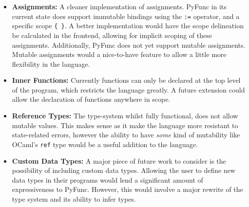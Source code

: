 \documentclass{l4proj}
\begin{document}
\begin{itemize}
    \item \textbf{Assignments:} A cleaner implementation of assignments.
    PyFunc in its current state does support immutable bindings using the \texttt{:=} operator, and a specific scope \texttt{\{ \}}.
    A better implementation would have the scope delineation be calculated in the frontend, allowing for implicit scoping of these assignments.
    Additionally, PyFunc does not yet support mutable assignments.
    Mutable assignments would a nice-to-have feature to allow a little more flexibility in the language.
    \item \textbf{Inner Functions:} Currently functions can only be declared at the top level of the program, which restricts the language greatly.
    A future extension could allow the declaration of functions anywhere in scope.

    \item \textbf{Reference Types:} The type-system whilst fully functional, does not allow mutable values.
    This makes sense as it make the language more resistant to state-related errors, however the ability to have \emph{some} kind of mutability like OCaml's \texttt{ref} type would be a useful addition to the language.

    \item \textbf{Custom Data Types:} A major piece of future work to consider is the possibility of including custom data types.
    Allowing the user to define new data types in their programs would lend a significant amount of expressiveness to PyFunc.
    However, this would involve a major rewrite of the type system and its ability to infer types.
\end{itemize}
%
% 
\end{document}
